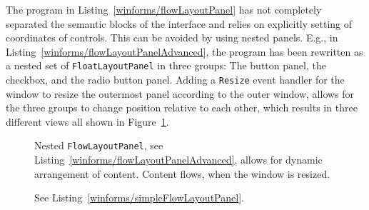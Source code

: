 The program in Listing~\ref{winforms/flowLayoutPanel} has not completely separated the semantic blocks of the interface and relies on explicitly setting of coordinates of controls. This can be avoided by using nested panels. E.g., in Listing~\ref{winforms/flowLayoutPanelAdvanced}, the program has been rewritten as a nested set of \lstinline{FloatLayoutPanel} in three groups: The button panel, the checkbox, and the radio button panel. Adding a \lstinline{Resize} event handler for the window to resize the outermost panel according to the outer window, allows for the three groups to change position relative to each other, which results in three different views all shown in Figure~\ref{fig:flowLayoutPanelAdvanced}.
%
%
%
\begin{figure}
  \centering
  \caption{Nested \lstinline!FlowLayoutPanel!, see Listing~\ref{winforms/flowLayoutPanelAdvanced}, allows for dynamic arrangement of content. Content flows, when the window is resized.}
  \label{fig:flowLayoutPanelAdvanced}
\end{figure}

%
%
\begin{figure}
  \centering
  \caption{See Listing~\ref{winforms/simpleFlowLayoutPanel}.}
  \label{fig: simpleFlowLayoutPanel}
\end{figure}

